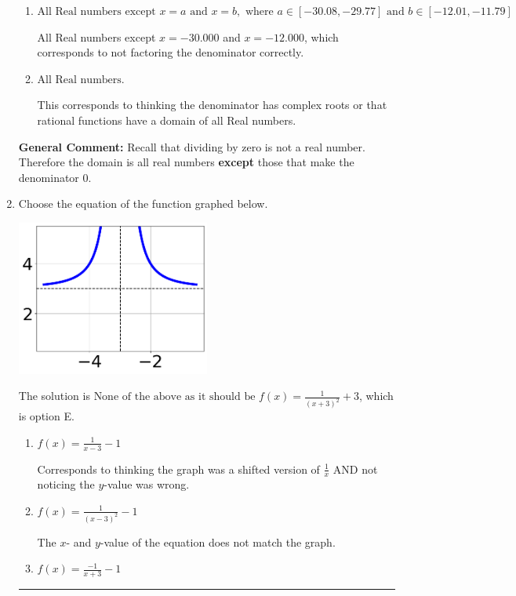 \documentclass{extbook}[14pt]
\newcommand{\litem}[1]{\item #1

\rule{\textwidth}{0.4pt}}
\begin{document}
\begin{enumerate}
{\begin{enumerate}[label=\Alph*.]
All Real numbers except $x = -0.833$, which corresponds to removing only 1 value from the denominator.
\item \( \text{All Real numbers except } x = a \text{ and } x = b, \text{ where } a \in [-30.08, -29.77] \text{ and } b \in [-12.01, -11.79] \)

All Real numbers except $x = -30.000$ and $x = -12.000$, which corresponds to not factoring the denominator correctly.
\item \( \text{All Real numbers.} \)

This corresponds to thinking the denominator has complex roots or that rational functions have a domain of all Real numbers.
\end{enumerate}

\textbf{General Comment:} Recall that dividing by zero is not a real number. Therefore the domain is all real numbers \textbf{except} those that make the denominator 0.
}
\litem{
Choose the equation of the function graphed below.

\begin{center}
    \includegraphics[width=0.5\textwidth]{../Figures/rationalGraphToEquationC.png}
\end{center}




The solution is \( \text{None of the above as it should be } f(x) = \frac{1}{(x + 3)^2} + 3 \), which is option E.\begin{enumerate}[label=\Alph*.]
\item \( f(x) = \frac{1}{x - 3} - 1 \)

Corresponds to thinking the graph was a shifted version of $\frac{1}{x}$ AND not noticing the $y$-value was wrong.
\item \( f(x) = \frac{1}{(x - 3)^2} - 1 \)

The $x$- and $y$-value of the equation does not match the graph.
\item \( f(x) = \frac{-1}{x + 3} - 1 \)


\end{enumerate}}
\end{enumerate}
\end{document}
